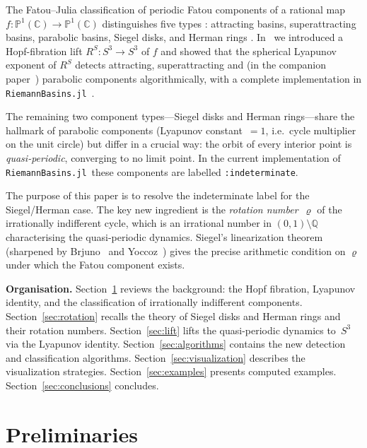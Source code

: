 \documentclass[12pt,a4paper]{article}
\newcommand{\Pone}{\mathbb{P}^1(\mathbb{C})}
\newcommand{\Sthree}{S^3}
\newcommand{\RS}{R^S}         %
\newcommand{\rot}{\varrho}    %
\newcommand{\QQ}{\mathbb{Q}}
\begin{document}
The Fatou--Julia classification of periodic Fatou components of a rational
map $f\colon\Pone\to\Pone$ distinguishes five types
\cite{Fatou1919,Fatou1920,Julia1918}:
attracting basins, superattracting basins, parabolic basins, Siegel disks,
and Herman rings \cite{Sullivan1983,Milnor2006}.
%
In~\cite{Alvarez2023} we introduced a Hopf-fibration lift
$\RS\colon\Sthree\to\Sthree$ of $f$ and showed that the spherical Lyapunov
exponent of $\RS$ detects attracting, superattracting and (in the companion
paper~\cite{FatouHopf2026}) parabolic components algorithmically, with a
complete implementation in \texttt{RiemannBasins.jl}\ \cite{RiemannBasins}.

The remaining two component types---Siegel disks and Herman rings---share
the hallmark of parabolic components (Lyapunov constant~$= 1$, i.e.\
cycle multiplier on the unit circle) but differ in a crucial way: the orbit
of every interior point is \emph{quasi-periodic}, converging to no limit
point.
In the current implementation of \texttt{RiemannBasins.jl}\ these components
are labelled \texttt{:indeterminate}.

The purpose of this paper is to resolve the indeterminate label for the
Siegel/Herman case.
The key new ingredient is the \emph{rotation number}~$\rot$ of the
irrationally indifferent cycle, which is an irrational number in
$(0,1)\setminus\QQ$ characterising the quasi-periodic dynamics.
Siegel's linearization theorem \cite{Siegel1942} (sharpened by
Brjuno~\cite{Brjuno1972} and Yoccoz~\cite{Yoccoz1988,Yoccoz1995}) gives
the precise arithmetic condition on $\rot$ under which the Fatou component
exists.

\medskip
\noindent\textbf{Organisation.}
Section~\ref{sec:prelim} reviews the background: the Hopf fibration,
Lyapunov identity, and the classification of irrationally indifferent
components.
Section~\ref{sec:rotation} recalls the theory of Siegel disks and Herman
rings and their rotation numbers.
Section~\ref{sec:lift} lifts the quasi-periodic dynamics to~$\Sthree$ via
the Lyapunov identity.
Section~\ref{sec:algorithms} contains the new detection and classification
algorithms.
Section~\ref{sec:visualization} describes the visualization strategies.
Section~\ref{sec:examples} presents computed examples.
Section~\ref{sec:conclusions} concludes.

\section{Preliminaries}
\label{sec:prelim}
\end{document}
